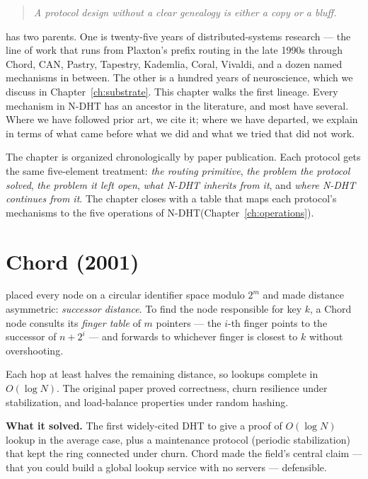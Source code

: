 \documentclass[twoside,nobib]{tufte-book}
\newcommand{\NDHT}{N-DHT\xspace}
\begin{document}
\begin{quote}
  \itshape A protocol design without a clear genealogy is either a
  copy or a bluff.
\end{quote}

 has two parents. One is twenty-five
years of distributed-systems research --- the line of work that runs
from Plaxton's prefix routing in the late 1990s through Chord, CAN,
Pastry, Tapestry, Kademlia, Coral, Vivaldi, and a dozen named
mechanisms in between. The other is a hundred years of neuroscience,
which we discuss in Chapter~\ref{ch:substrate}. This chapter walks
the first lineage. Every mechanism in \NDHT has an ancestor in the
literature, and most have several. Where we have followed prior art,
we cite it; where we have departed, we explain in terms of what came
before what we did and what we tried that did not work.

The chapter is organized chronologically by paper publication. Each
protocol gets the same five-element treatment: \emph{the routing
primitive}, \emph{the problem the protocol solved}, \emph{the
problem it left open}, \emph{what \NDHT inherits from it}, and
\emph{where \NDHT continues from it}. The chapter closes with a
table that maps each protocol's mechanisms to the five operations of
\NDHT (Chapter~\ref{ch:operations}).

\section{Chord (2001)}

 placed every node on a
circular identifier space modulo $2^m$ and made distance asymmetric:
\emph{successor distance}. To find the node responsible for key $k$,
a Chord node consults its \emph{finger table} of $m$ pointers ---
the $i$-th finger points to the successor of $n + 2^i$ --- and
forwards to whichever finger is closest to $k$ without overshooting.

Each hop at least halves the remaining distance, so lookups complete
in $O(\log N)$. The original paper proved correctness, churn
resilience under stabilization, and load-balance properties under
random hashing.

\textbf{What it solved.} The first widely-cited DHT to give a
proof of $O(\log N)$ lookup in the average case, plus a maintenance
protocol (periodic stabilization) that kept the ring connected
under churn. Chord made the field's central claim --- that you
could build a global lookup service with no
servers ---
defensible.
\end{document}
